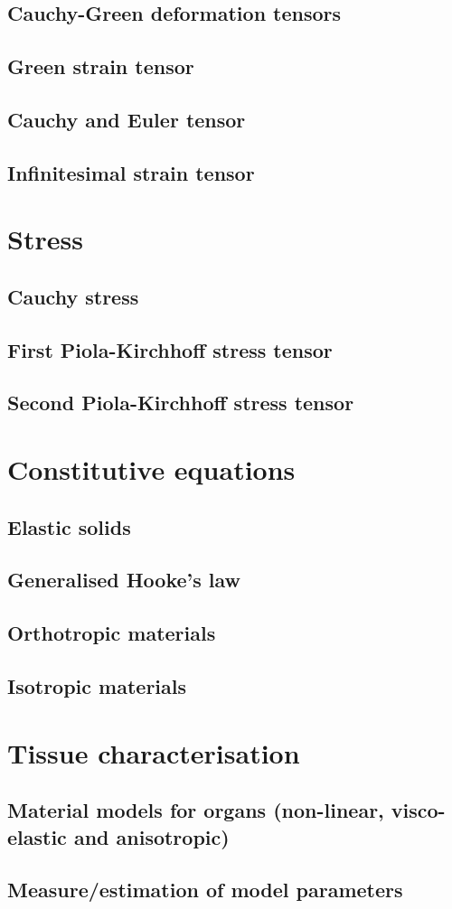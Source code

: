 	\subsection{Cauchy-Green deformation tensors}
	\subsection{Green strain tensor}
	\subsection{Cauchy and Euler tensor}
	\subsection{Infinitesimal strain tensor}
	
\section{Stress}
	\subsection{Cauchy stress}
	\subsection{First Piola-Kirchhoff stress tensor}
	\subsection{Second Piola-Kirchhoff stress tensor}
	
\section{Constitutive equations}
	\subsection{Elastic solids}	
	\subsection{Generalised Hooke's law}
	\subsection{Orthotropic materials}
	\subsection{Isotropic materials}
			
\section{Tissue characterisation}
	\subsection{Material models for organs (non-linear, visco-elastic and anisotropic)}
	\subsection{Measure/estimation of model parameters}